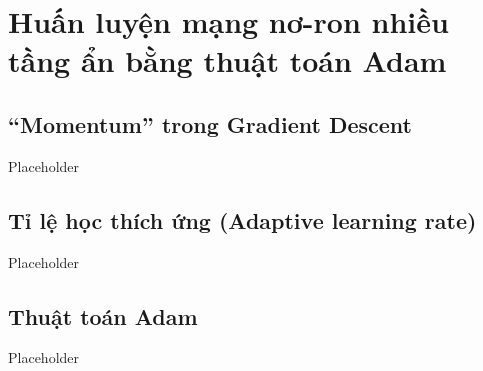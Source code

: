 \chapter{Huấn luyện mạng nơ-ron nhiều tầng ẩn bằng thuật toán Adam}
\label{Chapter3}

\section{``Momentum'' trong Gradient Descent}

Placeholder

\section{Tỉ lệ học thích ứng (Adaptive learning rate)}

Placeholder

\section{Thuật toán Adam}

Placeholder